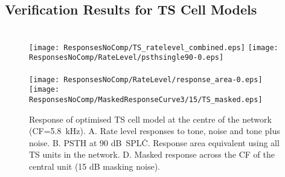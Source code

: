 \subsection{Verification Results for TS Cell Models}


\begin{figure}[htb]
\centering
\hspace{0.5cm}\hspace{0.5\textwidth}\hfill\\
\texttt{[image: ResponsesNoComp/TS\_ratelevel\_combined.eps]}\hfill%
\texttt{[image: ResponsesNoComp/RateLevel/psthsingle90-0.eps]}\\
\hspace{0.5cm}\hspace{0.5\textwidth}\hfill\\
\texttt{[image: ResponsesNoComp/RateLevel/response\_area-0.eps]}\hfill%
\texttt{[image: ResponsesNoComp/MaskedResponseCurve3/15/TS\_masked.eps]}\\
\caption[Optimised TS cell model responses]{Response of optimised TS cell model at the centre of the network (CF=5.8~kHz). A. Rate level responses to tone, noise and tone plus noise. 
B. PSTH at 90 dB~SPL\.  
C. Response area equivalent using all TS units in the network. 
D. Masked response across the CF of the central unit (15 dB masking noise).} \label{fig:TS_verification}
\end{figure}






